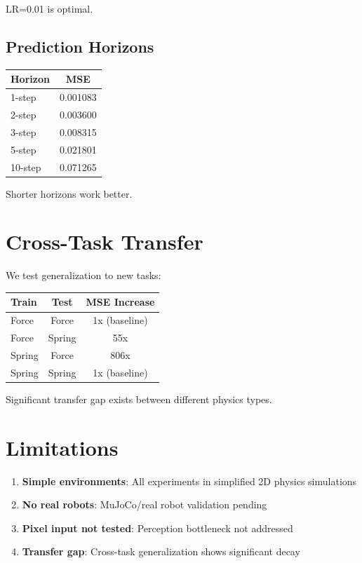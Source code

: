 \documentclass{article}
\begin{document}
LR=0.01 is optimal.

\subsection{Prediction Horizons}
\begin{center}
\begin{tabular}{l|c}
Horizon & MSE \\
\hline
1-step & 0.001083 \\
2-step & 0.003600 \\
3-step & 0.008315 \\
5-step & 0.021801 \\
10-step & 0.071265 \\
\end{tabular}
\end{center}

Shorter horizons work better.

\section{Cross-Task Transfer}

We test generalization to new tasks:

\begin{center}
\begin{tabular}{l|c|c}
Train & Test & MSE Increase \\
\hline
Force & Force & 1x (baseline) \\
Force & Spring & 55x \\
Spring & Force & 806x \\
Spring & Spring & 1x (baseline) \\
\end{tabular}
\end{center}

Significant transfer gap exists between different physics types.

\section{Limitations}

\begin{enumerate}
\item \textbf{Simple environments}: All experiments in simplified 2D physics simulations
\item \textbf{No real robots}: MuJoCo/real robot validation pending
\item \textbf{Pixel input not tested}: Perception bottleneck not addressed
\item \textbf{Transfer gap}: Cross-task generalization shows significant decay
\end{enumerate}
\end{document}
